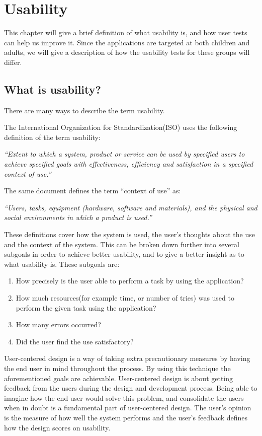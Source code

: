 \chapter{Usability}
\label{chp:usability}

This chapter will give a brief definition of what usability is, and how user tests can help us improve it. Since the applications are targeted at both children and adults, we will give a description of how the usability tests for these groups will differ.

\section{What is usability?}
\label{sec:usability}
There are many ways to describe the term usability. 

The International Organization for Standardization(ISO) uses the following definition of the term usability\cite{isousability}:

\textit{``Extent to which a system, product or service can be used by specified
users to achieve specified goals with effectiveness, efficiency
and satisfaction in a specified context of use.''}

The same document defines the term ``context of use'' as:

\textit{``Users, tasks, equipment (hardware, software and materials), and
the physical and social environments in which a product is used.''}

These definitions cover how the system is used, the user's thoughts about the use and the context of the system. This can be broken down further into several subgoals in order to achieve better usability, and to give a better insight as to what usability is. 
These subgoals are:

\begin{enumerate}
\item{How precisely is the user able to perform a task by using the application?}
\item{How much resources(for example time, or number of tries) was used to perform the given task using the application?}
\item{How many errors occurred?}
\item{Did the user find the use satisfactory?}
\end{enumerate}

User-centered design is a way of taking extra precautionary measures by having the end user in mind throughout the process. By using this technique the aforementioned goals are achievable. User-centered design is about getting feedback from the users during the design and development process. Being able to imagine how the end user would solve this problem, and consolidate the users when in doubt is a fundamental part of user-centered design. The user's opinion is the measure of how well the system performs and the user's feedback defines how the design scores on usability.


